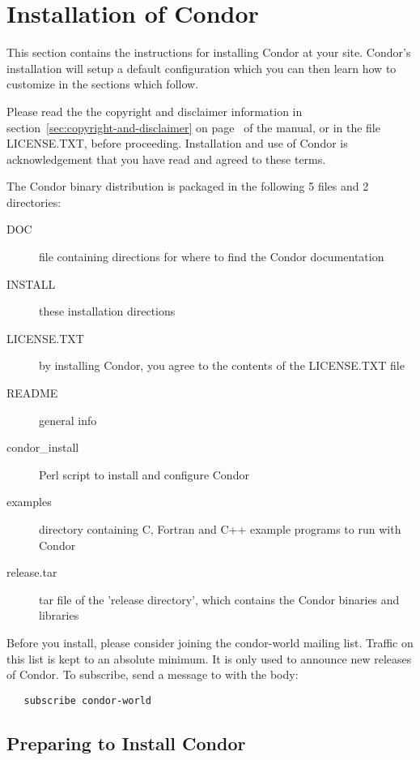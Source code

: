 \section{\label{sec:install}Installation of Condor}

This section contains the instructions for installing Condor at your
site.  Condor's installation will setup a default configuration which
you can then learn how to customize in the sections which follow.

Please read the the copyright and disclaimer information in 
section~\ref{sec:copyright-and-disclaimer} on
page~\pageref{sec:copyright-and-disclaimer} of the manual, or in the
file LICENSE.TXT, before proceeding.  Installation and
use of Condor is acknowledgement that you have read and agreed to these
terms.

The Condor binary distribution is packaged in the following 5 files
and 2 directories:

\begin{description}
\item[DOC] file containing directions for where to find the 
		  Condor documentation
\item[INSTALL] these installation directions
\item[LICENSE.TXT] by installing Condor, you agree to the contents of
		  the LICENSE.TXT file
\item[README] general info
\item[condor\_install] Perl script to install and configure Condor
\item[examples] directory containing C, Fortran and C++ example
		  programs to run with Condor
\item[release.tar] tar file of the 'release directory', which contains
		  the Condor binaries and libraries
\end{description}

Before you install, please consider joining the condor-world mailing
list.  Traffic on this list is kept to an absolute minimum.  It is only
used to announce new releases of Condor.  To subscribe, send a message
to  with the body:
\begin{verbatim}
   subscribe condor-world 
\end{verbatim}

\subsection{\label{sec:Preparing-to-Install}Preparing to Install
Condor} 

